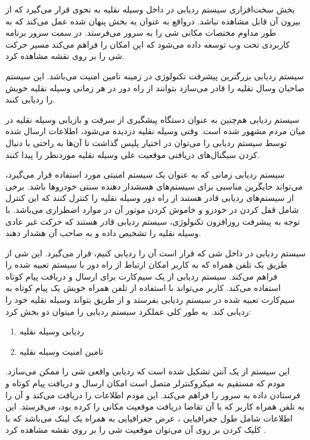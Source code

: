  
 بخش سخت‌افزاری سیستم ردیابی در داخل وسیله نقلیه به نحوی قرار می‌گیرد که از بیرون آن قابل مشاهده نباشد. درواقع به عنوان یه بخش پنهان شده عمل می‌کند که به طور مداوم مختصات مکانی شی را به سرور می‌فرستد.
 در سمت سرور برنامه کاربردی تحت وب توسعه داده می‌شود که این امکان را فراهم می‌کند  مسیر حرکت شی را بر روی نقشه مشاهده کرد.
 
 سیستم ردیابی بزرگترین پیشرفت تکنولوژی در زمینه تامین امنیت می‌باشد. این سیستم صاحبان وسال نقلیه را قادر می‌سازد بتوانند از راه دور در هر زمانی وسیله نقلیه خویش را ردیابی کنند.
 
 
 سیستم ردیابی هم‌چنین به عنوان دستگاه پیشگیری از سرقت و بازیابی وسیله نقلیه در میان مردم مشهور شده است. وقتی وسیله نقلیه دزدیده می‌شود، اطلاعات ارسال شده توسط سیستم ردیابی را می‌توان در اختیار پلیس گذاشت تا آن‌ها به راحتی با دنیال کردن سیگنال‌های دریافتی موقعیت علی وسیله نقلیه موردنظر را پیدا کنند.
 
 
 سیستم ردیابی زمانی که به عنوان یک سیستم امنیتی مورد استفاده قرار می‌گیرد، می‌تواند حایگرین مناسبی برای سیستم‌های هسشدار دهنده سنتی خودروها باشد. برخی از سیستم‌های ردیابی قادر هستند از راه دور وسیله نقلیه را کنترل کنند که این کنترل شامل قفل کردن در خودرو و خاموش کردن موتور آن در موارد اضطراری می‌باشد. با توجه به پیشرفت روزافزون تکنولوژی، سیستم ردیابی قادر هستند که حرکت غیر عادی وسیله نقلیه را تشخیص داده و به صاحب آن هشدار دهند.
 
  
  سیستم ردیابی در داخل شی که قرار است آن را ردیابی کنیم، قرار می‌گیرد. این شی از طزیق یک تلفن همراه که به کاربر امکان ارتباط از راه دور با سیستم تعبیه شده را فراهم می‌کند. سیستم ردیابی از یک سیم‌کارت برای ارسال و دربافت پیام کوتاه استفاده می‌کند. کاربر می‌تواند با استفاده از تلفن همراه خویش یک پیام کوتاه به سیم‌کارت تعبیه شده در سیستم ردیابی بفرستد و از طریق بتواند وسیله نقلیه خود را ردیابی کند.
به طور کلی عملکرد سیستم ردیابی را میتوان دو بخش کرد:
  \begin{enumerate}
  	\item ردیابی وسیله نقلیه
	\item تامین امنیت وسیله نقلیه
  \end{enumerate}
این سیستم از یک آنتن  تشکیل شده است که ردیابی واقعی شی را ممکن می‌سازد. مودم  که مستقیم به میکروکنترلر متصل است امکان ارسال و دریافت پیام کوتاه و فرستادن داده به سرور را فراهم می‌کند. این مودم اطلاعات را دریافت می‌کند و آن را به تلفن همراه کاربر که با آن تقاضا دریافت موقعیت مکانی را کرده بود، می‌فرستد. این اطلاعات شامل طول جغرافیایی ، عرض جغرافیایی  به همراه یک لینک می‌باشد که با کلیک کردن بر روی آن می‌توان موقعیت شی را بر روی نقشه مشاهده کرد \cite{Mahamulkar2017}.
